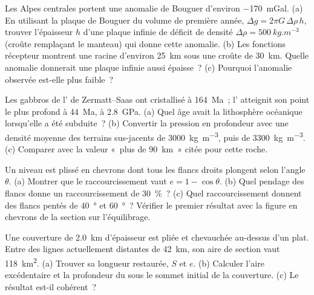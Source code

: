 \begin{exercise}[$\star\star$]\label{exo:b2:alpine-orogen:5}
Les Alpes centrales portent une anomalie de Bouguer d'environ \qty{-170}{mGal}. (a) En utilisant la plaque de
Bouguer du volume de première année, $\Delta g = 2\pi G\,\Delta\rho\,h$, trouver l'épaisseur $h$ d'une
plaque infinie de déficit de densité $\Delta\rho = \qty{500}{kg.m^{-3}}$ (croûte remplaçant le manteau)
qui donne cette anomalie. (b) Les fonctions récepteur montrent une racine d'environ \qty{25}{km} sous une
croûte de \qty{30}{km}. Quelle anomalie donnerait une plaque infinie aussi épaisse~? (c) Pourquoi l'anomalie
observée est-elle plus faible~?
\end{exercise}

\begin{exercise}[$\star\star$]\label{exo:b2:alpine-orogen:6}
Les gabbros de l' de Zermatt--Saas ont cristallisé à \qty{164}{Ma}~; l' atteignit
son point le plus profond à \qty{44}{Ma}, à \qty{2.8}{GPa}. (a) Quel âge avait la lithosphère océanique
lorsqu'elle a été subduite~? (b) Convertir la pression en profondeur avec une densité moyenne des terrains sus-jacents
de \qty{3000}{kg.m^{-3}}, puis de \qty{3300}{kg.m^{-3}}. (c) Comparer avec la valeur «~plus de \qty{90}{km}~»
citée pour cette roche.
\end{exercise}

\begin{exercise}[$\star\star$]\label{exo:b2:alpine-orogen:7}
Un niveau est plissé en chevrons dont tous les flancs droits plongent selon l'angle $\theta$.
(a) Montrer que le raccourcissement vaut $e = 1 - \cos\theta$. (b) Quel pendage des flancs donne
un raccourcissement de \qty{30}{\percent}~? (c) Quel raccourcissement donnent des flancs pentés de \qty{40}{\degree} et
\qty{60}{\degree}~? Vérifier le premier résultat avec la figure en chevrons de la section sur l'équilibrage.
\end{exercise}

\begin{exercise}[$\star\star$]\label{exo:b2:alpine-orogen:8}
Une couverture de \qty{2.0}{km} d'épaisseur est pliée et chevauchée au-dessus d'un  plat. Entre des lignes
actuellement distantes de \qty{42}{km}, son aire de section vaut \qty{118}{km^2}. (a) Trouver sa longueur restaurée,
$S$ et $e$. (b) Calculer l'aire excédentaire et la profondeur du  sous le
sommet initial de la couverture. (c) Le résultat est-il cohérent~?
\end{exercise}

